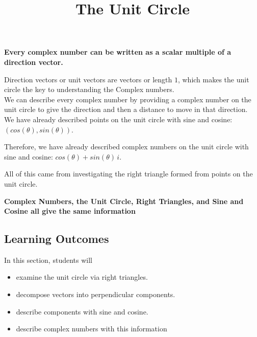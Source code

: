 \documentclass{ximera}
\title{The Unit Circle}
\begin{document}
\begin{abstract}
\end{abstract}
\maketitle




\begin{center}
\textbf{\textcolor{red!80!black}{Every complex number can be written as a scalar multiple of a direction vector.}}
\end{center}






Direction vectors or unit vectors are vectors or length $1$, which makes the unit circle the key to understanding the Complex numbers. \\ 



We can describe every complex number by providing a complex number on the unit circle to give the direction and then a distance to move in that direction.  \\ 

We have already described points on the unit circle with sine and cosine: $(cos(\theta), sin(\theta))$. 

Therefore, we have already described complex numbers on the unit circle with sine and cosine: $cos(\theta) + sin(\theta) \, i$.  


All of this came from investigating the right triangle formed from points on the unit circle. \\



\begin{center}
\textbf{\textcolor{purple!85!blue}{Complex Numbers, the Unit Circle, Right Triangles, and Sine and Cosine all give the same information}}
\end{center}









\subsection{Learning Outcomes}


\begin{sectionOutcomes}
In this section, students will 

\begin{itemize}
\item examine the unit circle via right triangles.
\item decompose vectors into perpendicular components.
\item describe components with sine and cosine.
\item describe complex numbers with this information
\end{itemize}
\end{sectionOutcomes}
\end{document}
